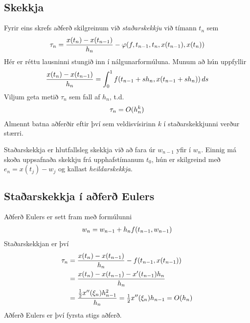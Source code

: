 \documentclass[letterpaper,10pt,icelandic]{sphinxmanual}
\begin{document}
\subsection{Skekkja}
\label{kafli06:index-13}\label{kafli06:skekkja}
Fyrir eins skrefs aðferð skilgreinum við \emph{staðarskekkju} við tímann
\(t_n\) sem
\begin{gather}
\begin{split}\tau_n = \dfrac{x(t_n)-x(t_{n-1})}{h_n} -
\varphi(f,t_{n-1},t_n,x(t_{n-1}),x(t_{n}))\end{split}\notag
\end{gather}
Hér er réttu lausninni stungið inn í nálgunarformúluna. Munum að hún
uppfyllir
\begin{gather}
\begin{split}\dfrac{x(t_n)-x(t_{n-1})}{h_n}
=\int_0^1 f(t_{n-1}+sh_n,x(t_{n-1}+sh_n))\, ds\end{split}\notag
\end{gather}
Viljum geta metið \(\tau_n\) sem fall af \(h_n\), t.d.
\begin{gather}
\begin{split}\tau_n = O(h_n^k)\end{split}\notag
\end{gather}
Almennt batna aðferðir eftir því sem veldisvísirinn \(k\) í
staðarskekkjunni verður stærri.

Staðarskekkja er hlutfallsleg skekkja við að fara úr \(w_{n-1}\)
yfir í \(w_n\). Einnig má skoða uppsafnaða skekkju frá
upphafstímanum \(t_0\), hún er skilgreind með
\(e_n = x(t_j)-w_j\) og kallast \emph{heildarskekkja}.


\subsection{Staðarskekkja í aðferð Eulers}
\label{kafli06:staarskekkja-i-afer-eulers}
Aðferð Eulers er sett fram með formúlunni
\begin{gather}
\begin{split}w_n=w_{n-1}+h_nf(t_{n-1},w_{n-1})\end{split}\notag
\end{gather}
Staðarskekkjan er því
\begin{gather}
\begin{split}\begin{aligned}
  \tau_n&=\dfrac{x(t_n)-x(t_{n-1})}{h_n}-f(t_{n-1},x(t_{n-1}))\\
&=\dfrac{x(t_n)-x(t_{n-1})-x'(t_{n-1})h_n}{h_n}\\
&=\dfrac{\tfrac 12 x''(\xi_{n})h_{n-1}^2}{h_n}
=\tfrac 12 x''(\xi_{n})h_{n-1}=O(h_n)\end{aligned}\end{split}\notag
\end{gather}
Aðferð Eulers er því fyrsta stigs aðferð.
\end{document}
